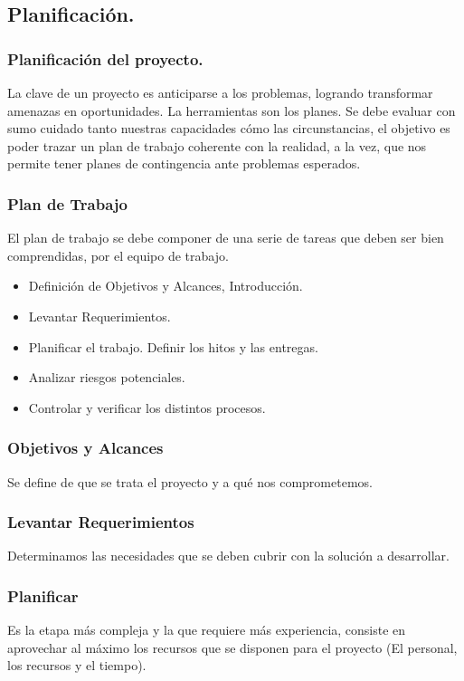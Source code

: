 \documentclass[12pt]{beamer}
\begin{document}
\subsection{Planificación.}

\begin{frame}
 \frametitle{Planificación del proyecto.}
 La clave de un proyecto es anticiparse a los problemas, logrando transformar amenazas en oportunidades.
 \newline
 La herramientas son los \alert{planes}. Se debe evaluar con sumo cuidado tanto nuestras capacidades cómo las circunstancias, el objetivo es poder trazar un plan de trabajo coherente con la realidad, a la vez, que nos permite tener planes de contingencia ante problemas esperados.
\end{frame}


\begin{frame}
 \frametitle{Plan de Trabajo}
 El plan de trabajo se debe componer de una serie de tareas que deben ser bien \alert{comprendidas}, por el equipo de trabajo.
 \begin{itemize}
  \item<2-> Definición de Objetivos y Alcances, Introducción.
  \item<3-> Levantar Requerimientos.
  \item<4-> Planificar el trabajo. Definir los \alert{hitos} y las entregas.
  \item<5-> Analizar riesgos potenciales.
  \item<6-> Controlar y verificar los distintos procesos.
 \end{itemize}
\end{frame}


\begin{frame}
 \frametitle{Objetivos y Alcances}
 Se define de que se trata el proyecto y a qué nos \alert{comprometemos}.
\end{frame}


\begin{frame}
 \frametitle{Levantar Requerimientos}
 Determinamos las necesidades que se deben cubrir con la solución a desarrollar.
\end{frame}


\begin{frame}
 \frametitle{Planificar}
 Es la etapa más compleja y la que requiere más experiencia, consiste en aprovechar al máximo los recursos que se disponen para el proyecto (El personal, los recursos y el tiempo).
\end{frame}
\end{document}
